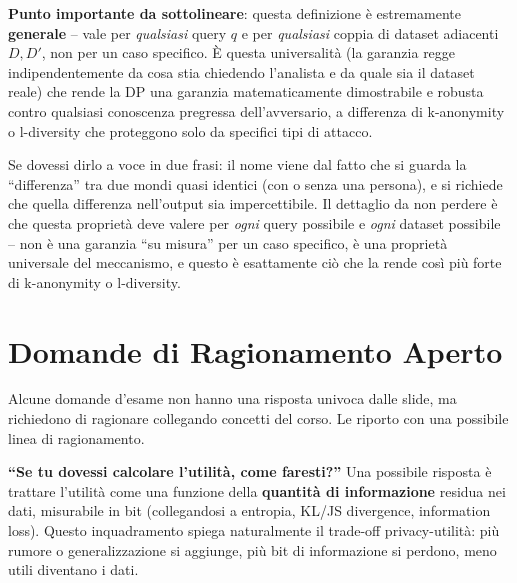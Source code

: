 \documentclass[a4paper,11pt]{article}
\begin{document}
\textbf{Punto importante da sottolineare}: questa definizione \`{e} estremamente \textbf{generale} -- vale per \emph{qualsiasi} query $q$ e per \emph{qualsiasi} coppia di dataset adiacenti $D, D'$, non per un caso specifico. \`{E} questa universalit\`{a} (la garanzia regge indipendentemente da cosa stia chiedendo l'analista e da quale sia il dataset reale) che rende la DP una garanzia matematicamente dimostrabile e robusta contro qualsiasi conoscenza pregressa dell'avversario, a differenza di k-anonymity o l-diversity che proteggono solo da specifici tipi di attacco.

\begin{nota}
Se dovessi dirlo a voce in due frasi: il nome viene dal fatto che si guarda la ``differenza'' tra due mondi quasi identici (con o senza una persona), e si richiede che quella differenza nell'output sia impercettibile. Il dettaglio da non perdere \`{e} che questa propriet\`{a} deve valere per \emph{ogni} query possibile e \emph{ogni} dataset possibile -- non \`{e} una garanzia ``su misura'' per un caso specifico, \`{e} una propriet\`{a} universale del meccanismo, e questo \`{e} esattamente ci\`{o} che la rende cos\`{i} pi\`{u} forte di k-anonymity o l-diversity.
\end{nota}

\section{Domande di Ragionamento Aperto}

\begin{domanda}
Alcune domande d'esame non hanno una risposta univoca dalle slide, ma richiedono di ragionare collegando concetti del corso. Le riporto con una possibile linea di ragionamento.
\end{domanda}

\textbf{``Se tu dovessi calcolare l'utilit\`{a}, come faresti?''} Una possibile risposta \`{e} trattare l'utilit\`{a} come una funzione della \textbf{quantit\`{a} di informazione} residua nei dati, misurabile in bit (collegandosi a entropia, KL/JS divergence, information loss). Questo inquadramento spiega naturalmente il trade-off privacy-utilit\`{a}: pi\`{u} rumore o generalizzazione si aggiunge, pi\`{u} bit di informazione si perdono, meno utili diventano i dati.
\end{document}
